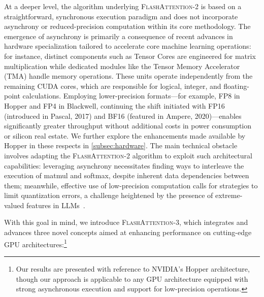 At a deeper level, the algorithm underlying \textsc{FlashAttention-2} is based on a straightforward, synchronous execution paradigm and does not incorporate asynchrony or reduced-precision computation within its core methodology. The emergence of asynchrony is primarily a consequence of recent advances in hardware specialization tailored to accelerate core machine learning operations: for instance, distinct components such as Tensor Cores are engineered for matrix multiplication while dedicated modules like the Tensor Memory Accelerator (TMA) handle memory operations. These units operate independently from the remaining CUDA cores, which are responsible for logical, integer, and floating-point calculations. Employing lower-precision formats—for example, FP8 in Hopper and FP4 in Blackwell, continuing the shift initiated with FP16 (introduced in Pascal, 2017) and BF16 (featured in Ampere, 2020)—enables significantly greater throughput without additional costs in power consumption or silicon real estate. We further explore the enhancements made available by Hopper in these respects in \cref{subsec:hardware}. The main technical obstacle involves adapting the \textsc{FlashAttention-2} algorithm to exploit such architectural capabilities: leveraging asynchrony necessitates finding ways to interleave the execution of matmul and softmax, despite inherent data dependencies between them; meanwhile, effective use of low-precision computation calls for strategies to limit quantization errors, a challenge heightened by the presence of extreme-valued features in LLMs~\citep{dettmers2208llm, sun2024massive}.

With this goal in mind, we introduce \textsc{FlashAttention-3}, which integrates and advances three novel concepts aimed at enhancing performance on cutting-edge GPU architectures:\footnote{Our results are presented with reference to NVIDIA's Hopper architecture, though our approach is applicable to any GPU architecture equipped with strong asynchronous execution and support for low-precision operations.}

